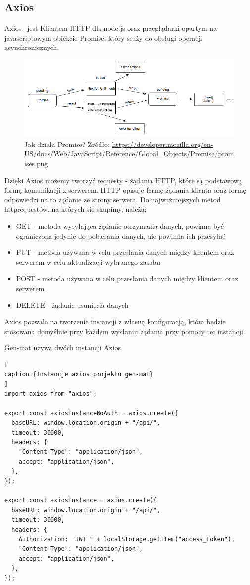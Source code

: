\documentclass[oneside,polski,logo,indent]{amuthesis}
\begin{document}
\subsection{Axios}
Axios~\cite{axios} jest Klientem HTTP dla node.js oraz przeglądarki opartym na javascriptowym obiekcie Promise, który służy do obsługi operacji asynchronicznych.

\begin{figure}[H]
\centering
\includegraphics[width=13cm]{promises.png}
\caption{Jak działa Promise?
\newline
Źródło: \url{https://developer.mozilla.org/en-US/docs/Web/JavaScript/Reference/Global_Objects/Promise/promises.png}
}
\label{react dev example.jpg}
\end{figure}

Dzięki Axios możemy tworzyć requesty - żądania HTTP, które są podstawową formą komunikacji z serwerem. HTTP opisuje formę żądania klienta oraz formę odpowiedzi na to żądanie ze strony serwera. Do najważniejszych metod httprequestów, na których się skupimy, należą:
\begin{itemize}
\item GET - metoda wysyłająca żądanie otrzymania danych, powinna być ograniczona jedynie do pobierania danych, nie powinna ich przesyłać
\item PUT - metoda używana w celu przesłania danych między klientem oraz serwerem w celu aktualizacji wybranego zasobu
\item POST - metoda używana w celu przesłania danych między klientem oraz serwerem
\item DELETE - żądanie usunięcia danych
\end{itemize}
Axios pozwala na tworzenie instancji z własną konfiguracją, która będzie stosowana domyślnie przy każdym wysłaniu żądania przy pomocy
tej instancji.


Gen-mat używa dwóch instancji Axios.

\begin{lstlisting}[
caption={Instancje axios projektu gen-mat}
]
import axios from "axios";

export const axiosInstanceNoAuth = axios.create({
  baseURL: window.location.origin + "/api/",
  timeout: 30000,
  headers: {
    "Content-Type": "application/json",
    accept: "application/json",
  },
});

export const axiosInstance = axios.create({
  baseURL: window.location.origin + "/api/",
  timeout: 30000,
  headers: {
    Authorization: "JWT " + localStorage.getItem("access_token"),
    "Content-Type": "application/json",
    accept: "application/json",
  },
});


\end{lstlisting}
\end{document}
